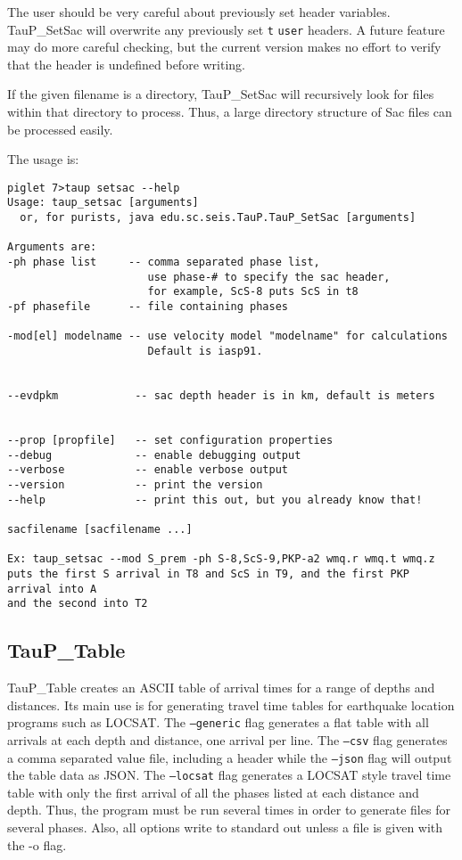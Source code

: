 The user should be very careful about previously set header variables.
TauP\_SetSac will
overwrite any previously set \texttt{t} \texttt{user} headers. A future feature may do
more careful checking, but the current version makes no effort to verify that
the header is undefined before writing.

If the given filename is a directory, TauP\_SetSac will recursively look for files within that directory to process. Thus,
a large directory structure of Sac files can be processed easily.

The usage is:
\begin{verbatim}
piglet 7>taup setsac --help
Usage: taup_setsac [arguments]
  or, for purists, java edu.sc.seis.TauP.TauP_SetSac [arguments]

Arguments are:
-ph phase list     -- comma separated phase list,
                      use phase-# to specify the sac header,
                      for example, ScS-8 puts ScS in t8
-pf phasefile      -- file containing phases

-mod[el] modelname -- use velocity model "modelname" for calculations
                      Default is iasp91.


--evdpkm            -- sac depth header is in km, default is meters


--prop [propfile]   -- set configuration properties
--debug             -- enable debugging output
--verbose           -- enable verbose output
--version           -- print the version
--help              -- print this out, but you already know that!

sacfilename [sacfilename ...]

Ex: taup_setsac --mod S_prem -ph S-8,ScS-9,PKP-a2 wmq.r wmq.t wmq.z
puts the first S arrival in T8 and ScS in T9, and the first PKP arrival into A
and the second into T2
\end{verbatim}

\subsection{TauP\_Table}

TauP\_Table creates an ASCII table of arrival times for a range of depths and
distances. Its main use is for generating travel time tables for earthquake
location programs such as LOCSAT. The \texttt{--generic} flag generates a flat
table with all arrivals at each depth and distance, one arrival per line.
The \texttt{--csv} flag generates a comma separated value file, including
a header while the \texttt{--json} flag will output the table data as JSON.
The \texttt{--locsat} flag generates a LOCSAT style travel time table with
only the first arrival of all the phases listed at each distance and depth.
Thus, the program must be run several times in order to generate files for
several phases. Also, all options write to standard out unless a file is
given with the -o flag.

